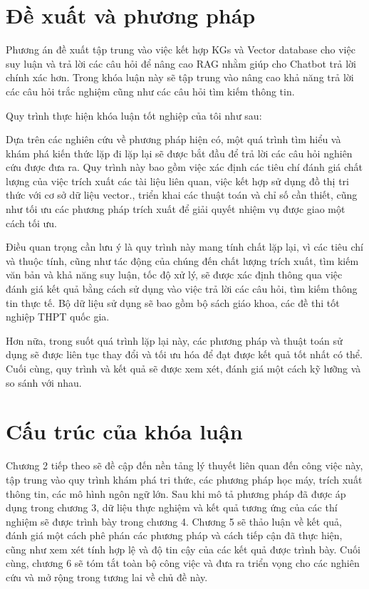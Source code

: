 \section{Đề xuất và phương pháp}
\label{section:proposed_method}
Phương án đề xuất tập trung vào việc kết hợp KGs và Vector database cho việc suy luận và trả lời các câu hỏi để nâng cao RAG nhằm giúp cho Chatbot trả lời chính xác hơn. Trong khóa luận này sẽ tập trung vào nâng cao khả năng trả lời các câu hỏi trắc nghiệm cũng như các câu hỏi tìm kiếm thông tin.

Quy trình thực hiện khóa luận tốt nghiệp của tôi như sau:

Dựa trên các nghiên cứu về phương pháp hiện có, một quá trình tìm hiểu và khám phá kiến thức lặp đi lặp lại sẽ được bắt đầu để trả lời các câu hỏi nghiên cứu được đưa ra. Quy trình này bao gồm việc xác định các tiêu chí đánh giá chất lượng của việc trích xuất các tài liệu liên quan, việc kết hợp sử dụng đồ thị tri thức với cơ sở dữ liệu vector., triển khai các thuật toán và chỉ số cần thiết, cũng như tối ưu các phương pháp trích xuất để giải quyết nhiệm vụ được giao một cách tối ưu.

Điều quan trọng cần lưu ý là quy trình này mang tính chất lặp lại, vì các tiêu chí và thuộc tính, cũng như tác động của chúng đến chất lượng trích xuất, tìm kiếm văn bản và khả năng suy luận, tốc độ xử lý, sẽ được xác định thông qua việc đánh giá kết quả bằng cách sử dụng vào việc trả lời các câu hỏi, tìm kiếm thông tin thực tế. Bộ dữ liệu sử dụng sẽ bao gồm bộ sách giáo khoa, các đề thi tốt nghiệp THPT quốc gia.

Hơn nữa, trong suốt quá trình lặp lại này, các phương pháp và thuật toán sử dụng sẽ được liên tục thay đổi và tối ưu hóa để đạt được kết quả tốt nhất có thể. Cuối cùng, quy trình và kết quả sẽ được xem xét, đánh giá một cách kỹ lưỡng và so sánh với nhau.

\section{Cấu trúc của khóa luận}
Chương 2 tiếp theo sẽ đề cập đến nền tảng lý thuyết liên quan đến công việc này, tập trung vào quy trình khám phá tri thức, các phương pháp học máy, trích xuất thông tin, các mô hình ngôn ngữ lớn. Sau khi mô tả phương pháp đã được áp dụng trong chương 3, dữ liệu thực nghiệm và kết quả tương ứng của các thí nghiệm sẽ được trình bày trong chương 4. Chương 5 sẽ thảo luận về kết quả, đánh giá một cách phê phán các phương pháp và cách tiếp cận đã thực hiện, cũng như xem xét tính hợp lệ và độ tin cậy của các kết quả được trình bày. Cuối cùng, chương 6 sẽ tóm tắt toàn bộ công việc và đưa ra triển vọng cho các nghiên cứu và mở rộng trong tương lai về chủ đề này.